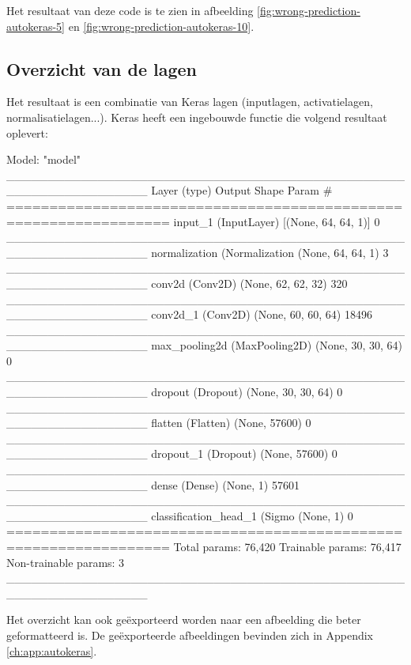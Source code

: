 Het resultaat van deze code is te zien in afbeelding \ref{fig:wrong-prediction-autokeras-5} en \ref{fig:wrong-prediction-autokeras-10}.

\subsection{Overzicht van de lagen}
\label{subsec:model-overview}

Het resultaat is een combinatie van Keras lagen (inputlagen, activatielagen, normalisatielagen...). Keras heeft een ingebouwde functie  die volgend resultaat oplevert:

\bigskip

\begin{python}
Model: "model"
_________________________________________________________________
Layer (type)                 Output Shape              Param #   
=================================================================
input_1 (InputLayer)         [(None, 64, 64, 1)]       0         
_________________________________________________________________
normalization (Normalization (None, 64, 64, 1)         3         
_________________________________________________________________
conv2d (Conv2D)              (None, 62, 62, 32)        320       
_________________________________________________________________
conv2d_1 (Conv2D)            (None, 60, 60, 64)        18496     
_________________________________________________________________
max_pooling2d (MaxPooling2D) (None, 30, 30, 64)        0         
_________________________________________________________________
dropout (Dropout)            (None, 30, 30, 64)        0         
_________________________________________________________________
flatten (Flatten)            (None, 57600)             0         
_________________________________________________________________
dropout_1 (Dropout)          (None, 57600)             0         
_________________________________________________________________
dense (Dense)                (None, 1)                 57601     
_________________________________________________________________
classification_head_1 (Sigmo (None, 1)                 0         
=================================================================
Total params: 76,420
Trainable params: 76,417
Non-trainable params: 3
_________________________________________________________________
\end{python}

Het overzicht kan ook geëxporteerd worden naar een afbeelding die beter geformatteerd is. De geëxporteerde afbeeldingen bevinden zich in Appendix \ref{ch:app:autokeras}.


